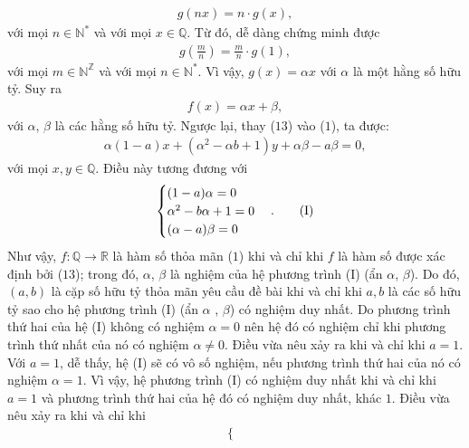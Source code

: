 \begin{multicols}{2}
\begin{align*}
		g\left( {nx} \right) = n \cdot g\left( x \right),
	\end{align*}
	với mọi $n \in \mathbb{N^*}$  và với mọi  $x \in \mathbb{Q}$.
	\vskip 0.05cm
	Từ đó, dễ dàng chứng minh được
	\begin{align*}
		g\left( {\frac{m}{n}} \right) = \frac{m}{n} \cdot g\left( 1 \right),
	\end{align*}
	với mọi $m \in \mathbb{N^Z}$  và với mọi $n \in \mathbb{N^*}$.
	\vskip 0.05cm 
	Vì vậy, $g(x) = \alpha x$  với $\alpha$  là một hằng số hữu tỷ.
	\vskip 0.05cm
	Suy ra
	\begin{align*}
		f\left( x \right) = \alpha x + \beta , \tag{$13$}
	\end{align*}     
	với $\alpha$, $\beta$  là các hằng số hữu tỷ.
	\vskip 0.05cm
	Ngược lại, thay ($13$) vào ($1$), ta được:
	\begin{align*}
		\alpha \left(\! {1 \!-\! a} \!\right)x \!+\! \left(\! {{\alpha ^2} \!-\! \alpha b \!+\! 1} \right)y \!+\! \alpha \beta  \!-\! a\beta  \!=\! 0, 
	\end{align*}
	với mọi $x,y \in \mathbb{Q}$.
	\vskip 0.05cm
	Điều này tương đương với
	\begin{align*}
		\begin{cases}
			(1-a)\alpha = 0\\
			\alpha^2 - b\alpha + 1 = 0\\
			(\alpha - a)\beta = 0
		\end{cases} . \tag{$\text{I}$}
	\end{align*}
	Như vậy, $f: \mathbb{Q} \to \mathbb{R}$  là hàm số thỏa mãn ($1$) khi và chỉ khi $f$  là hàm số được xác định bởi ($13$); trong đó, $\alpha$, $\beta$  là nghiệm của hệ phương trình ($\text{I}$) (ẩn  $\alpha$, $\beta$).
	\vskip 0.05cm
	Do đó, $(a, b)$ là cặp số hữu tỷ thỏa mãn yêu cầu đề bài khi và chỉ khi $a, b$ là các số hữu tỷ sao cho hệ phương trình ($\text{I}$) (ẩn  $\alpha$ , $\beta$) có nghiệm duy nhất.
	\vskip 0.05cm
	Do phương trình thứ hai của hệ ($\text{I}$) không có nghiệm $\alpha = 0$  nên hệ đó có nghiệm chỉ khi phương trình thứ nhất của nó có nghiệm  $\alpha \ne 0$. Điều vừa nêu xảy ra khi và chỉ khi $a = 1$.
	\vskip 0.05cm
	Với $a = 1$, dễ thấy, hệ ($\text{I}$) sẽ có vô số nghiệm, nếu phương trình thứ hai của nó có nghiệm $\alpha = 1$.
	\vskip 0.05cm 
	Vì vậy, hệ phương trình ($\text{I}$) có nghiệm duy nhất khi và chỉ khi $a = 1$ và phương trình thứ hai của hệ đó có nghiệm duy nhất, khác $1$. Điều vừa nêu xảy ra khi và chỉ khi
	\begin{align*}
		\begin{cases}

\end{cases}
\end{align*}
\end{multicols}
